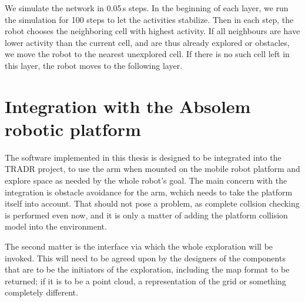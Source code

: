 \documentclass[buriama8_dp.tex]{subfiles}
\begin{document}
We simulate the network in 0.05\,s steps. In the beginning of each layer, we run the simulation for 100 steps to let the activities stabilize. Then in each step, the robot chooses the neighboring cell with highest activity. If all neighbours are have lower activity than the current cell, and are thus already explored or obstacles, we move the robot to the nearest unexplored cell. If there is no such cell left in this layer, the robot moves to the following layer.

\section{Integration with the Absolem robotic platform}
\label{sec:integr}

The software implemented in this thesis is designed to be integrated into the TRADR project, to use the arm when mounted on the mobile robot platform and explore space as needed by the whole robot's goal. The main concern with the integration is obstacle avoidance for the arm, wchich needs to take the platform itself into account. That should not pose a problem, as complete collsion checking is performed even now, and it is only a matter of adding the platform collision model into the environment.

The second matter is the interface via which the whole exploration will be invoked. This will need to be agreed upon by the designers of the components that are to be the initiators of the exploration, including the map format to be returned; if it is to be a point cloud, a representation of the grid or something completely different. 
\end{document}
